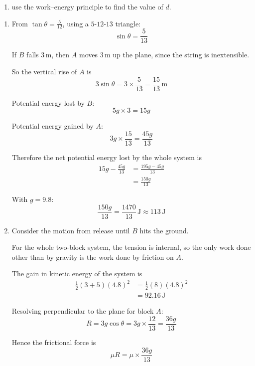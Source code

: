 \documentclass[leqno]{article}
\begin{document}
\begin{enumerate}[
  label=\textbf{\arabic*.},
  leftmargin=*,
  topsep=0pt,
  partopsep=0pt,
  parsep=0pt
]
\begin{enumerate}[label=\textbf{(\alph*)}, resume]
  \item use the work--energy principle to find the value of $d$.  \\
\end{enumerate}

\vspace*{10pt}

\begin{djsSolution}
\begin{enumerate}[label=\textbf{(\alph*)}]
  \item From \(\tan\theta=\frac{5}{12}\), using a \(5\text{-}12\text{-}13\) triangle:
  \[
  \sin\theta=\frac{5}{13}
  \]

  If \(B\) falls \(3\,\mathrm{m}\), then \(A\) moves \(3\,\mathrm{m}\) up the plane, since the string is inextensible.

  So the vertical rise of \(A\) is
  \[
  3\sin\theta=3\times \frac{5}{13}=\frac{15}{13}\,\mathrm{m}
  \]

  Potential energy lost by \(B\):
  \[
  5g\times 3=15g
  \]

  Potential energy gained by \(A\):
  \[
  3g\times \frac{15}{13}=\frac{45g}{13}
  \]

  Therefore the net potential energy lost by the whole system is
  \begin{align*}
  15g-\frac{45g}{13}
  &=\frac{195g-45g}{13}\\
  &=\frac{150g}{13}
  \end{align*}

  With \(g=9.8\):
  \[
  \frac{150g}{13}=\frac{1470}{13}\,\mathrm{J}\approx 113\,\mathrm{J}
  \]

  \item Consider the motion from release until \(B\) hits the ground.

  For the whole two-block system, the tension is internal, so the only work done other than by gravity is the work done by friction on \(A\).

  The gain in kinetic energy of the system is
  \begin{align*}
  \frac12(3+5)(4.8)^2
  &=\frac12(8)(4.8)^2\\
  &=92.16\,\mathrm{J}
  \end{align*}

  Resolving perpendicular to the plane for block \(A\):
  \[
  R=3g\cos\theta=3g\times \frac{12}{13}=\frac{36g}{13}
  \]

  Hence the frictional force is
  \[
  \mu R=\mu\times \frac{36g}{13}
  \]


\end{enumerate}
\end{djsSolution}
\end{enumerate}
\end{document}
